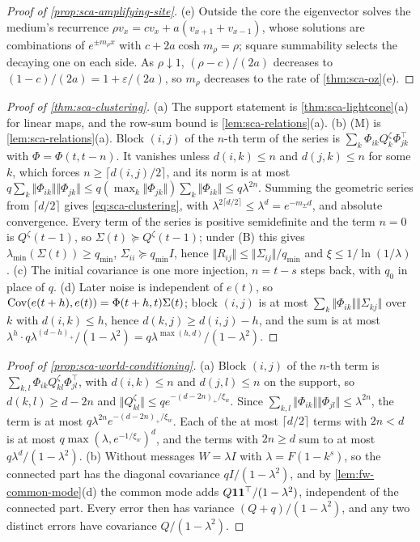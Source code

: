 \begin{proof}[Proof of \cref{prop:sca-amplifying-site}]
(e) Outside the core the eigenvector solves the medium's recurrence $\rho v_x=cv_x+a(v_{x+1}+v_{x-1})$, whose solutions are combinations of $e^{\pm m_\rho x}$ with $c+2a\cosh m_\rho=\rho$; square summability selects the decaying one on each side. As $\rho\downarrow1$, $(\rho-c)/(2a)$ decreases to $(1-c)/(2a)=1+\varepsilon/(2a)$, so $m_\rho$ decreases to the rate of \cref{thm:sca-oz}(e).
\end{proof}

\begin{proof}[Proof of \cref{thm:sca-clustering}]
(a) The support statement is \cref{thm:sca-lightcone}(a) for linear maps, and the row-sum bound is \cref{lem:sca-relations}(a). (b) \textup{(M)} is \cref{lem:sca-relations}(a). Block $(i,j)$ of the $n$-th term of the series is $\sum_k\Phi_{ik}Q^\zeta_k\Phi_{jk}^\top$ with $\Phi=\Phi(t,t-n)$. It vanishes unless $d(i,k)\le n$ and $d(j,k)\le n$ for some $k$, which forces $n\ge\lceil d(i,j)/2\rceil$, and its norm is at most $q\sum_k\Vert\Phi_{ik}\Vert\Vert\Phi_{jk}\Vert\le q(\max_k\Vert\Phi_{jk}\Vert)\sum_k\Vert\Phi_{ik}\Vert\le q\lambda^{2n}$. Summing the geometric series from $\lceil d/2\rceil$ gives \eqref{eq:sca-clustering}, with $\lambda^{2\lceil d/2\rceil}\le\lambda^d=e^{-m_\Sigma d}$, and absolute convergence. Every term of the series is positive semidefinite and the term $n=0$ is $Q^\zeta(t-1)$, so $\Sigma(t)\succeq Q^\zeta(t-1)$; under \textup{(B)} this gives $\lambda_{\min}(\Sigma(t))\ge q_{\min}$, $\Sigma_{ii}\succeq q_{\min}I$, hence $\Vert R_{ij}\Vert\le\Vert\Sigma_{ij}\Vert/q_{\min}$ and $\xi\le1/\ln(1/\lambda)$. (c) The initial covariance is one more injection, $n=t-s$ steps back, with $q_0$ in place of $q$. (d) Later noise is independent of $e(t)$, so $\operatorname{Cov}(e(t+h),e(t))=\Phi(t+h,t)\Sigma(t)$; block $(i,j)$ is at most $\sum_k\Vert\Phi_{ik}\Vert\Vert\Sigma_{kj}\Vert$ over $k$ with $d(i,k)\le h$, hence $d(k,j)\ge d(i,j)-h$, and the sum is at most $\lambda^h\cdot q\lambda^{(d-h)_+}/(1-\lambda^2)=q\lambda^{\max(h,d)}/(1-\lambda^2)$.
\end{proof}

\begin{proof}[Proof of \cref{prop:sca-world-conditioning}]
(a) Block $(i,j)$ of the $n$-th term is $\sum_{k,l}\Phi_{ik}Q^\zeta_{kl}\Phi_{jl}^\top$, with $d(i,k)\le n$ and $d(j,l)\le n$ on the support, so $d(k,l)\ge d-2n$ and $\Vert Q^\zeta_{kl}\Vert\le qe^{-(d-2n)_+/\xi_w}$. Since $\sum_{k,l}\Vert\Phi_{ik}\Vert\Vert\Phi_{jl}\Vert\le\lambda^{2n}$, the term is at most $q\lambda^{2n}e^{-(d-2n)_+/\xi_w}$. Each of the at most $\lceil d/2\rceil$ terms with $2n<d$ is at most $q\max(\lambda,e^{-1/\xi_w})^d$, and the terms with $2n\ge d$ sum to at most $q\lambda^d/(1-\lambda^2)$. (b) Without messages $W=\lambda I$ with $\lambda=F(1-k^s)$, so the connected part has the diagonal covariance $qI/(1-\lambda^2)$, and by \cref{lem:fw-common-mode}(d) the common mode adds $Q\mathbf{1}\mathbf{1}^\top/(1-\lambda^2)$, independent of the connected part. Every error then has variance $(Q+q)/(1-\lambda^2)$, and any two distinct errors have covariance $Q/(1-\lambda^2)$.
\end{proof}

